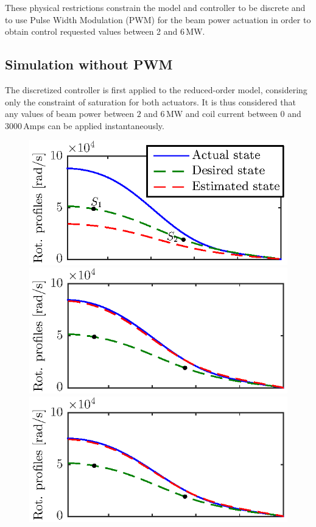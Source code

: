 \documentclass{iopart}
\begin{document}
These physical restrictions constrain the model and controller to be discrete and to use Pulse Width Modulation (PWM) for the beam power actuation in order to obtain control requested values between 2 and 6\,MW.


\subsection{Simulation without PWM}
\label{noPWM}

The discretized controller is first applied to the reduced-order model, considering only the constraint of saturation for both actuators. It is thus considered that any values of beam power between $2$ and $6$\,MW and coil current between $0$ and $3000$\,Amps can be applied instantaneously.   

\begin{figure}
	\centering
	\includegraphics{fig12a} \\[-0.3em] %
	\includegraphics{fig12b} \\[-0.3em] %
	\includegraphics{fig12c} \\[-0.3em] %

\end{figure}
\end{document}
